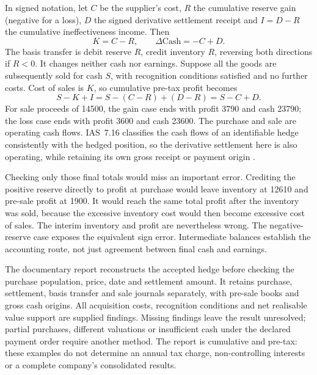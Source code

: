 In signed notation, let $C$ be the supplier's cost, $R$ the cumulative
reserve gain (negative for a loss), $D$ the signed derivative settlement
receipt and $I=D-R$ the cumulative ineffectiveness income. Then
\[
 K=C-R,\qquad
 \Delta\mathrm{Cash}=-C+D.
\]
The basis transfer is debit reserve $R$, credit inventory $R$, reversing
both directions if $R<0$. It changes neither cash nor earnings. Suppose
all the goods are subsequently sold for cash $S$, with recognition
conditions satisfied and no further costs. Cost of sales is $K$, so
cumulative pre-tax profit becomes
\[
 S-K+I=S-(C-R)+(D-R)=S-C+D.
\]
For sale proceeds of 14500, the gain case ends with profit 3790 and cash
23790; the loss case ends with profit 3600 and cash 23600. The purchase
and sale are operating cash flows. IAS~7.16 classifies the cash flows of
an identifiable hedge consistently with the hedged position, so the
derivative settlement here is also operating, while retaining its own
gross receipt or payment origin \citep[IAS~7, paragraph 16]{eu20231803}.

Checking only those final totals would miss an important error. Crediting
the positive reserve directly to profit at purchase would leave inventory
at 12610 and pre-sale profit at 1900. It would reach the same total profit
after the inventory was sold, because the excessive inventory cost would
then become excessive cost of sales. The interim inventory and profit
are nevertheless wrong. The negative-reserve case exposes the equivalent
sign error. Intermediate balances establish the accounting route, not
just agreement between final cash and earnings.

The documentary  report reconstructs the
accepted hedge before checking the purchase population, price, date and
settlement amount. It retains purchase, settlement, basis transfer and
sale journals separately, with pre-sale books and gross cash origins.
All acquisition costs, recognition conditions and net realisable value
support are supplied findings. Missing findings leave the result unresolved;
partial purchases, different valuations or insufficient cash under the
declared payment order require another method. The report is cumulative
and pre-tax: these examples do not determine an annual tax charge,
non-controlling interests or a complete company's consolidated results.

